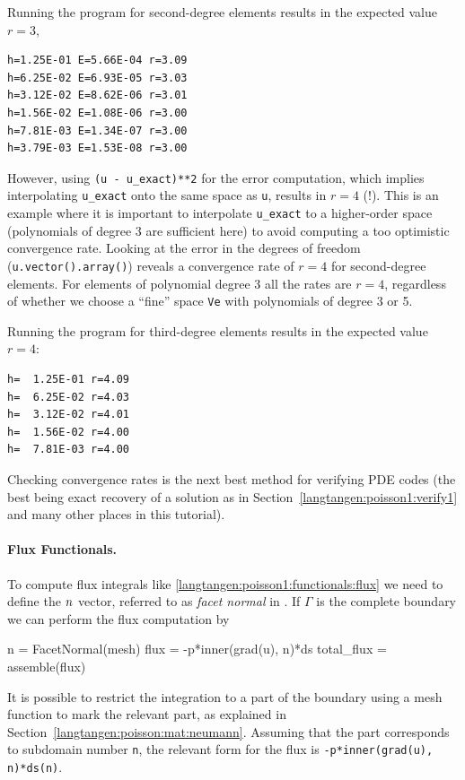 Running the program for second-degree elements results in the expected
value $r=3$,
\begin{Verbatim}[fontsize=\fontsize{10pt}{10pt},tabsize=8,baselinestretch=0.85,
fontfamily=tt,xleftmargin=7mm]
h=1.25E-01 E=5.66E-04 r=3.09
h=6.25E-02 E=6.93E-05 r=3.03
h=3.12E-02 E=8.62E-06 r=3.01
h=1.56E-02 E=1.08E-06 r=3.00
h=7.81E-03 E=1.34E-07 r=3.00
h=3.79E-03 E=1.53E-08 r=3.00
\end{Verbatim}
\noindent
However, using {\fontsize{10pt}{10pt}\verb!(u - u_exact)**2!} for the error computation, which
implies interpolating {\fontsize{10pt}{10pt}\verb!u_exact!} onto the same space as {\fontsize{10pt}{10pt}\texttt{u}},
results in $r=4$ (!). This is an example where it is important to
interpolate {\fontsize{10pt}{10pt}\verb!u_exact!} to a higher-order space (polynomials of
degree 3 are sufficient here) to avoid computing a too optimistic
convergence rate. Looking at the error in the degrees of
freedom ({\fontsize{10pt}{10pt}\texttt{u.vector().array()}}) reveals a convergence rate of $r=4$
for second-degree elements. For elements of polynomial degree 3
all the rates are
$r=4$, regardless of whether we choose a ``fine'' space
{\fontsize{10pt}{10pt}\texttt{Ve}} with polynomials of degree 3 or 5.


Running the program for third-degree elements results in the
expected value $r=4$:
\begin{Verbatim}[fontsize=\fontsize{10pt}{10pt},tabsize=8,baselinestretch=0.85,
fontfamily=tt,xleftmargin=7mm]
h=  1.25E-01 r=4.09
h=  6.25E-02 r=4.03
h=  3.12E-02 r=4.01
h=  1.56E-02 r=4.00
h=  7.81E-03 r=4.00
\end{Verbatim}
\noindent
Checking convergence rates is the next best method for verifying PDE codes
(the best being exact recovery of a solution as in Section~\ref{langtangen:poisson1:verify1} and many other places in this tutorial).

\paragraph{Flux Functionals.}
To compute flux integrals like \eqref{langtangen:poisson1:functionals:flux}
we need to define the ${n}$ vector, referred to as \emph{facet normal}
in \fenics. If $\Gamma$ is the complete boundary we can perform
the flux computation by
\begin{python}
n = FacetNormal(mesh)
flux = -p*inner(grad(u), n)*ds
total_flux = assemble(flux)
\end{python}
It is possible to restrict the integration to a part of the boundary
using a mesh function to mark the relevant part, as
explained in Section~\ref{langtangen:poisson:mat:neumann}. Assuming that the
part corresponds to subdomain number {\fontsize{10pt}{10pt}\texttt{n}}, the relevant form for the
flux is {\fontsize{10pt}{10pt}\texttt{-p*inner(grad(u), n)*ds(n)}}.


